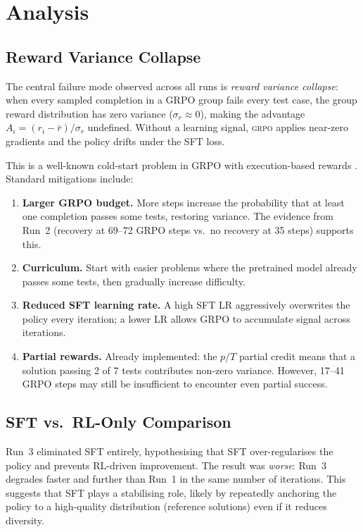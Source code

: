 \documentclass[11pt,a4paper]{article}
\newcommand{\grpo}{\textsc{grpo}}
\begin{document}
\section{Analysis}

\subsection{Reward Variance Collapse}

The central failure mode observed across all runs is \emph{reward variance
collapse}: when every sampled completion in a GRPO group fails every test
case, the group reward distribution has zero variance
($\sigma_r \approx 0$), making the advantage $A_i = (r_i - \bar{r})/\sigma_r$
undefined. Without a learning signal, \grpo{} applies near-zero gradients and
the policy drifts under the SFT loss.

This is a well-known cold-start problem in GRPO with execution-based rewards
\cite{deepswe,openreasonerzero}. Standard mitigations include:

\begin{enumerate}[nosep]
  \item \textbf{Larger GRPO budget.}
    More steps increase the probability that at least one completion passes
    some tests, restoring variance. The evidence from Run~2 (recovery at
    69--72 GRPO steps vs.\ no recovery at 35 steps) supports this.
  \item \textbf{Curriculum.}
    Start with easier problems where the pretrained model already passes some
    tests, then gradually increase difficulty.
  \item \textbf{Reduced SFT learning rate.}
    A high SFT LR aggressively overwrites the policy every iteration; a lower
    LR allows GRPO to accumulate signal across iterations.
  \item \textbf{Partial rewards.}
    Already implemented: the $p/T$ partial credit means that a solution passing
    2 of 7 tests contributes non-zero variance. However, 17--41 GRPO steps
    may still be insufficient to encounter even partial success.
\end{enumerate}

\subsection{SFT vs.\ RL-Only Comparison}

Run~3 eliminated SFT entirely, hypothesising that SFT over-regularises the
policy and prevents RL-driven improvement. The result was \emph{worse}:
Run~3 degrades faster and further than Run~1 in the same number of iterations.
This suggests that SFT plays a stabilising role, likely by repeatedly anchoring
the policy to a high-quality distribution (reference solutions) even if it
reduces diversity.
\end{document}
